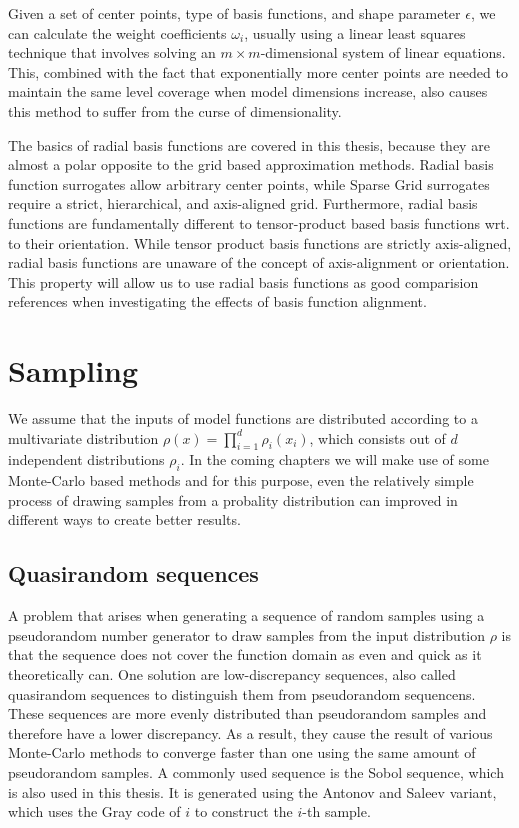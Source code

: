 \documentclass[
  a4paper,  %
  twoside,  %
  bibliography=totoc,
  headsepline,
  cleardoublepage=empty,
  parskip=half,
  draft=false
]{scrbook}
\begin{document}
Given a set of center points, type of basis functions, and shape parameter $\epsilon$, we can calculate the weight coefficients $\omega_i$, usually using a linear least squares technique that involves solving an $m \times m$-dimensional system of linear equations.
This, combined with the fact that exponentially more center points are needed to maintain the same level coverage when model dimensions increase, also causes this method to suffer from the curse of dimensionality.

The basics of radial basis functions are covered in this thesis, because they are almost a polar opposite to the grid based approximation methods.
Radial basis function surrogates allow arbitrary center points, while Sparse Grid surrogates require a strict, hierarchical, and axis-aligned grid.
Furthermore, radial basis functions are fundamentally different to tensor-product based basis functions wrt. to their orientation.
While tensor product basis functions are strictly axis-aligned, radial basis functions are unaware of the concept of axis-alignment or orientation.
This property will allow us to use radial basis functions as good comparision references when investigating the effects of basis function alignment.

\section{Sampling}

We assume that the inputs of model functions are distributed according to a multivariate distribution $\rho(x)=\prod_{i=1}^d \rho_i(x_i)$, which consists out of $d$ independent distributions $\rho_i$.
In the coming chapters we will make use of some Monte-Carlo based methods and for this purpose, even the relatively simple process of drawing samples from a probality distribution can improved in different ways to create better results.

\subsection{Quasirandom sequences}

A problem that arises when generating a sequence of random samples using a pseudorandom number generator to draw samples from the input distribution $\rho$ is that the sequence does not cover the function domain as even and quick as it theoretically can.
One solution are low-discrepancy sequences, also called quasirandom sequences to distinguish them from pseudorandom sequencens.
These sequences are more evenly distributed than pseudorandom samples and therefore have a lower discrepancy.
As a result, they cause the result of various Monte-Carlo methods to converge faster than one using the same amount of pseudorandom samples.
A commonly used sequence is the Sobol sequence, which is also used in this thesis.
It is generated using the Antonov and Saleev variant, which uses the Gray code of $i$ to construct the $i$-th sample.
\end{document}

